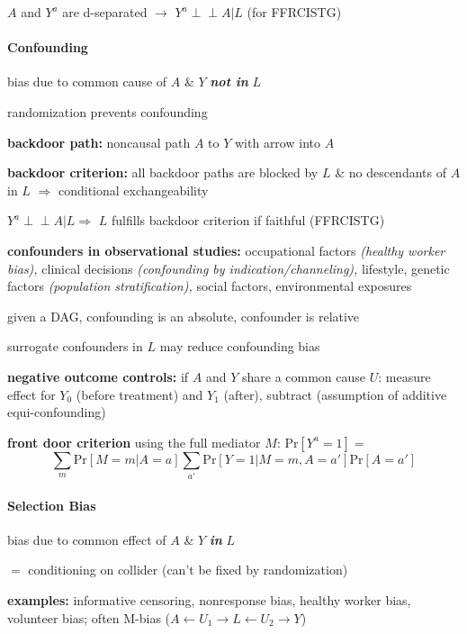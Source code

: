 \documentclass[8pt,oneside]{extarticle}
\newcommand{\indep}{\perp \!\!\! \perp}
\begin{document}
\begin{multicols}{2}
\noindent $A$ and $Y^a$ are d-separated $\rightarrow$ $Y^a \indep A|L$ (for FFRCISTG)



\paragraph{\large Confounding} bias due to common cause of $A$ \& $Y$ \textbf{\textit{not in}} $L$

\noindent randomization prevents confounding

\noindent \textbf{backdoor path:} noncausal path $A$ to $Y$ with arrow into $A$

\noindent \textbf{backdoor criterion:} all backdoor paths are blocked by $L$ \& no descendants of $A$ in $L$ $\Rightarrow$ conditional exchangeability

\noindent $Y^a {\indep} A|L \Rightarrow$ $L$ fulfills backdoor criterion if faithful (FFRCISTG)



\noindent \textbf{confounders in observational studies:} occupational factors \textit{(healthy worker bias),} clinical decisions \textit{(confounding by indication/channeling),} lifestyle, genetic factors \textit{(population stratification),} social factors, environmental exposures

\noindent given a DAG, confounding is an absolute, confounder is relative

\noindent surrogate confounders in $L$ may reduce confounding bias

\noindent \textbf{negative outcome controls:} if $A$ and $Y$ share a common cause $U$: measure effect for $Y_0$ (before treatment) and $Y_1$ (after), subtract (assumption of additive equi-confounding)

\noindent \textbf{front door criterion} using the full mediator $M$: $\mathrm{Pr}\left[Y^a=1\right]=$
$$\sum_m \mathrm{Pr}\left[M=m|A=a\right] \sum_{a'} \mathrm{Pr}\left[Y=1|M=m, A=a'\right]\mathrm{Pr}\left[A=a'\right]$$


\paragraph{\large Selection Bias} bias due to common effect of $A$ \& $Y$ \textbf{\textit{in}} $L$

 \noindent $=$ conditioning on collider (can't be  fixed by randomization)


\noindent \textbf{examples:} informative censoring, nonresponse bias, healthy worker bias, volunteer bias; often M-bias ($A {\leftarrow} U_1 {\to} L {\leftarrow} U_2 {\to} Y$)



\end{multicols}
\end{document}
